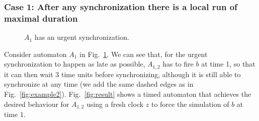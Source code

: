 \documentclass{LMCS}
\theoremstyle{plain}\newtheorem*{prop11}{Proposition~\ref{prop:states} bis}
\begin{document}
\subsubsection*{Case 1:
After any synchronization there is a local run of maximal duration}
\begin{figure}[tp]
  \centering
  \def\b{3.7}
  \caption{$A_1$ has an urgent synchronization.}\label{fig:urgent}
\end{figure}
Consider automaton $A_1$ in Fig.~\ref{fig:urgent}.
We can see that, for the urgent synchronization to happen as late as possible,
$A_{1,2}$ has to fire $b$ at time 1, so that it can then wait 3 time units
before synchronizing, although it is still able to synchronize at any time (we
add the same dashed edges as in Fig.~\ref{fig:example2}). Fig.~\ref{fig:result}
shows a timed automaton that achieves the desired behaviour for $A_{1,2}$
using a fresh clock $z$ to force the simulation of $b$ at time $1$.
\end{document}
